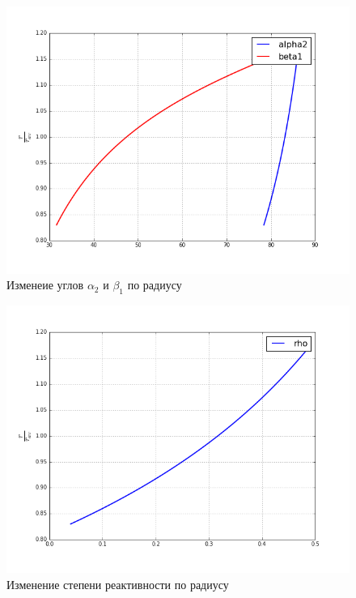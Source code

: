 \documentclass[a4paper,10pt]{article}
\begin{document}
\begin{figure}[hbtp]
\centering
\includegraphics[scale=0.3]{../../plots/alpha2_beta1_st1.png}
\caption{Изменеие углов $\alpha_2$ и $\beta_1$ по радиусу}
\end{figure}

\begin{figure}[hbtp]
\centering
\includegraphics[scale=0.3]{../../plots/rho_st1.png}
\caption{Изменение степени реактивности по радиусу}
\end{figure}
\end{document}

